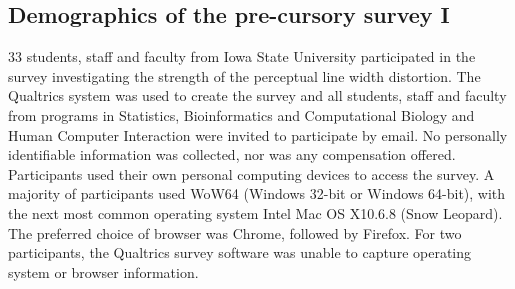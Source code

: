 %

%
\appendix
\subsection*{Demographics of the pre-cursory survey I}\label{app1}
33 students, staff and faculty from Iowa State University participated in the survey investigating the strength of the perceptual line width distortion. The Qualtrics system \cite{} was used to create the survey and all students, staff and faculty from programs in Statistics, Bioinformatics and Computational Biology and Human Computer Interaction were invited to participate by email. No personally identifiable information was collected, nor was any compensation offered. Participants used their own personal computing devices to access the survey. A majority of participants used WoW64 (Windows 32-bit or Windows 64-bit), with the next most common operating system Intel Mac OS X10.6.8 (Snow Leopard). The preferred choice of browser was  Chrome, followed by Firefox. 
For two participants, the Qualtrics survey software was unable to capture operating system or browser information.
% 


